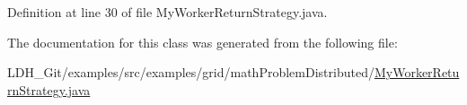 Definition at line 30 of file My\-Worker\-Return\-Strategy.\-java.



The documentation for this class was generated from the following file\-:\begin{DoxyCompactItemize}
\item 
L\-D\-H\-\_\-\-Git/examples/src/examples/grid/math\-Problem\-Distributed/\hyperlink{math_problem_distributed_2_my_worker_return_strategy_8java}{My\-Worker\-Return\-Strategy.\-java}\end{DoxyCompactItemize}
